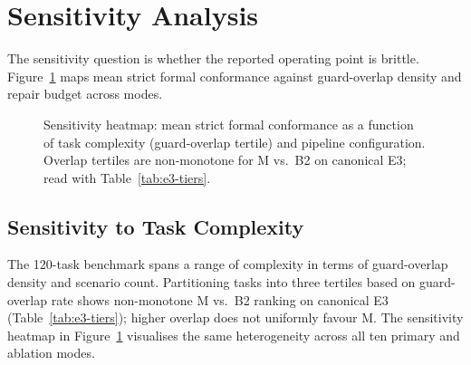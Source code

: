 \begin{table}[H]
  \caption{M\_lite vs.\ B6 vs.\ B2 on 120-task hard benchmark (E18).}
  \label{tab:m-lite}
  \centering
\end{table}

\section{Sensitivity Analysis}
\label{sec:results:sensitivity}

The sensitivity question is whether the reported operating point is brittle.
Figure~\ref{fig:sensitivity-heatmap} maps mean strict formal conformance against
guard-overlap density and repair budget across modes.

\begin{figure}[t]
  \centering
  \caption{Sensitivity heatmap: mean strict formal conformance as a function of
    task complexity (guard-overlap tertile) and pipeline configuration.
    Overlap tertiles are non-monotone for M vs.\ B2 on canonical E3; read with
    Table~\ref{tab:e3-tiers}.}
  \label{fig:sensitivity-heatmap}
\end{figure}

\subsection{Sensitivity to Task Complexity}

The 120-task benchmark spans a range of complexity in terms of guard-overlap density
and scenario count.
Partitioning tasks into three tertiles based on guard-overlap rate shows
non-monotone M vs.\ B2 ranking on canonical E3 (Table~\ref{tab:e3-tiers});
higher overlap does not uniformly favour M.
The sensitivity heatmap in Figure~\ref{fig:sensitivity-heatmap} visualises the
same heterogeneity across all ten primary and ablation modes.

